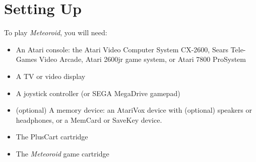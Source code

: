 \documentclass[10pt,twocolumn,openany,article]{memoir}
\begin{document}
\let\cleardoublepage\clearpage

\mainmatter

\tableofcontents

\chapter{Setting Up}\label{Setting Up}

To play \textit{Meteoroid}, you will need:

\begin{itemize}
\item An Atari  console: the Atari Video Computer  System CX-2600, Sears
  Tele-Games  Video Arcade,  Atari  2600jr game  system,  or Atari  7800
  ProSystem
\item A TV or video display
\item        A        joystick         controller        (or        SEGA
  \ifdefined{}\fi{}MegaDrive                     gamepad)
\item (optional) A memory device: an AtariVox device with (optional) speakers or
  headphones, or a MemCard or SaveKey device.
  \ifdefined\PLUSCART
\item The PlusCart cartridge
  \else
\item The \textit{Meteoroid} game cartridge
  \fi
\end{itemize}
\end{document}
